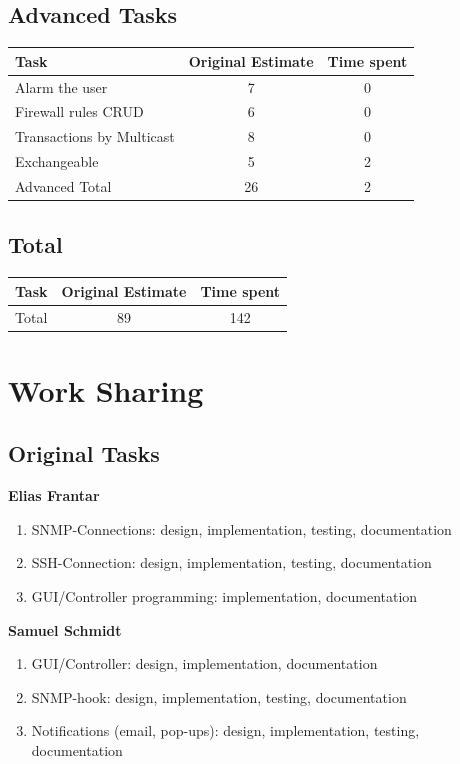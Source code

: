 \documentclass[11pt, a4paper]{article}
\begin{document}
\subsection{Advanced Tasks}
\begin{tabular} {| l | c | c |}\hline
Task &	Original Estimate & Time spent \\ \hline
Alarm the user &	7	& 0 \\ \hline
Firewall rules CRUD &	6 & 	0 \\ \hline
Transactions by Multicast &	8  &	0 \\ \hline
Exchangeable & 5 & 2 \\ \hline
Advanced Total & 26 &	2 \\ \hline
\end{tabular}

\subsection{Total}
\begin{tabular} {| l | c | c |}\hline
	Task &	Original Estimate & Time spent \\ \hline
	Total & 89 & 142 \\ \hline
\end{tabular}

\newpage

\section{Work Sharing}

\subsection{Original Tasks}

\textbf{Elias Frantar}
\begin{enumerate}[noitemsep]
	\item SNMP-Connections: design, implementation, testing, documentation
	\item SSH-Connection: design, implementation, testing, documentation
	\item GUI/Controller programming: implementation, documentation
\end{enumerate}

\noindent \textbf{Samuel Schmidt}
\begin{enumerate}[noitemsep]
	\item GUI/Controller: design, implementation, documentation
	\item SNMP-hook: design, implementation, testing, documentation
	\item Notifications (email, pop-ups): design, implementation, testing, documentation
\end{enumerate}
\end{document}
